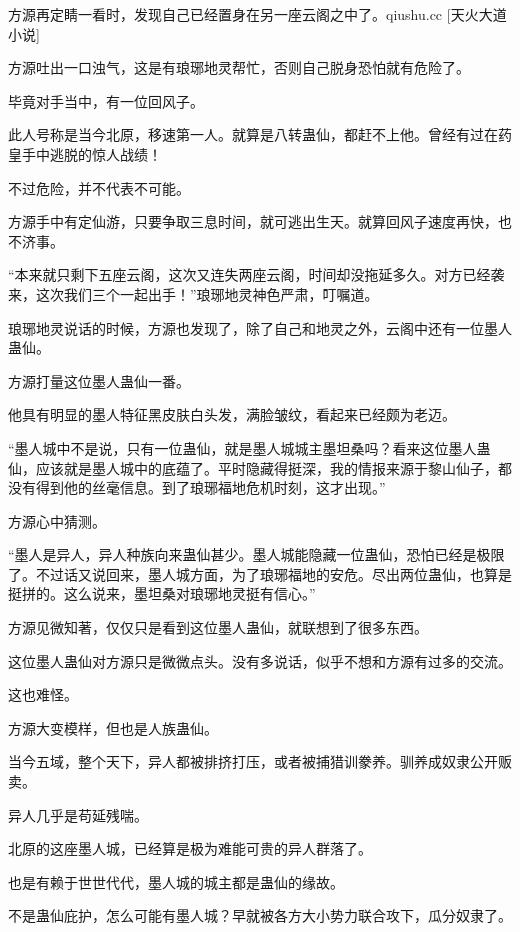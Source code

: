 
\begin{this_body}

方源再定睛一看时，发现自己已经置身在另一座云阁之中了。qiushu.cc [天火大道小说]

方源吐出一口浊气，这是有琅琊地灵帮忙，否则自己脱身恐怕就有危险了。

毕竟对手当中，有一位回风子。

此人号称是当今北原，移速第一人。就算是八转蛊仙，都赶不上他。曾经有过在药皇手中逃脱的惊人战绩！

不过危险，并不代表不可能。

方源手中有定仙游，只要争取三息时间，就可逃出生天。就算回风子速度再快，也不济事。

“本来就只剩下五座云阁，这次又连失两座云阁，时间却没拖延多久。对方已经袭来，这次我们三个一起出手！”琅琊地灵神色严肃，叮嘱道。

琅琊地灵说话的时候，方源也发现了，除了自己和地灵之外，云阁中还有一位墨人蛊仙。

方源打量这位墨人蛊仙一番。

他具有明显的墨人特征黑皮肤白头发，满脸皱纹，看起来已经颇为老迈。

“墨人城中不是说，只有一位蛊仙，就是墨人城城主墨坦桑吗？看来这位墨人蛊仙，应该就是墨人城中的底蕴了。平时隐藏得挺深，我的情报来源于黎山仙子，都没有得到他的丝毫信息。到了琅琊福地危机时刻，这才出现。”

方源心中猜测。

“墨人是异人，异人种族向来蛊仙甚少。墨人城能隐藏一位蛊仙，恐怕已经是极限了。不过话又说回来，墨人城方面，为了琅琊福地的安危。尽出两位蛊仙，也算是挺拼的。这么说来，墨坦桑对琅琊地灵挺有信心。”

方源见微知著，仅仅只是看到这位墨人蛊仙，就联想到了很多东西。

这位墨人蛊仙对方源只是微微点头。没有多说话，似乎不想和方源有过多的交流。

这也难怪。

方源大变模样，但也是人族蛊仙。

当今五域，整个天下，异人都被排挤打压，或者被捕猎训豢养。驯养成奴隶公开贩卖。

异人几乎是苟延残喘。

北原的这座墨人城，已经算是极为难能可贵的异人群落了。

也是有赖于世世代代，墨人城的城主都是蛊仙的缘故。

不是蛊仙庇护，怎么可能有墨人城？早就被各方大小势力联合攻下，瓜分奴隶了。


\end{this_body}
